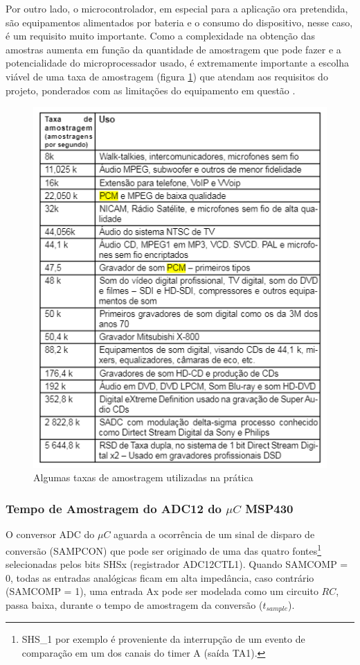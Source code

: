 		Por outro lado, o microcontrolador, em especial para a aplicação ora pretendida, são equipamentos alimentados por bateria e o consumo do dispositivo, nesse caso, é um requisito muito importante. Como a complexidade na obtenção das amostras aumenta em função da quantidade de amostragem que pode fazer e a potencialidade do microprocessador usado, é extremamente importante a escolha viável de uma taxa de amostragem (figura \ref{fig-taxa-de-amostragem-exemplos}) que atendam aos requisitos do projeto, ponderados com as limitações do equipamento em questão \cite{Braga2012}.
		
		\begin{figure}[!ht]
			\label{fig-taxa-de-amostragem-exemplos}
			\centering
			\includegraphics[scale=0.8]{./figuras/fig-exemplo-taxa-amostragem.png}
			\caption{Algumas taxas de amostragem utilizadas na prática}
		\end{figure}
	
		\subsubsection{Tempo de Amostragem do ADC12 do $\mu C$ MSP430}
			
			O conversor ADC do $\mu C$ aguarda a ocorrência de um sinal de disparo de conversão (SAMPCON) que pode ser originado de uma das quatro fontes\footnote{SHS\_1 por exemplo é proveniente da interrupção de um evento de comparação em um dos canais do timer A (saída TA1).} selecionadas pelos bits SHSx (registrador ADC12CTL1). Quando SAMCOMP = 0, todas as entradas analógicas ficam em alta impedância, caso contrário (SAMCOMP = 1), uma entrada Ax pode ser modelada como um circuito $RC$, passa baixa, durante o tempo de amostragem da conversão ($t_{sample}$).
			
